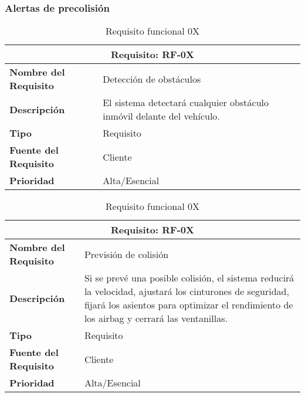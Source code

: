 \documentclass[10pt,a4paper,oldfontcommands]{dpds}
\begin{document}
\subsubsection{Alertas de precolisión}

\begin{table}[H]
\begin{center}
\begin{tabular}{p{} p{7cm}}
\multicolumn{2}{c}{\textbf{Requisito: RF-0X} } \\
\hline \hline
\textbf{Nombre del Requisito} & Detección de obstáculos\\
\textbf{Descripción} &  El sistema detectará cualquier obstáculo inmóvil delante del vehículo.\\
\textbf{Tipo} & Requisito  \\
\textbf{Fuente del Requisito} & Cliente  \\
\textbf{Prioridad} & Alta/Esencial \\ \hline
\end{tabular}
\caption{Requisito funcional 0X}
\label{tab:personal}
\end{center}
\end{table}

\begin{table}[H]
\begin{center}
\begin{tabular}{p{} p{7cm}}
\multicolumn{2}{c}{\textbf{Requisito: RF-0X} } \\
\hline \hline
\textbf{Nombre del Requisito} & Previsión de colisión\\
\textbf{Descripción} &  Si se prevé una posible colisión, el sistema reducirá la velocidad, ajustará los cinturones de seguridad, fijará los asientos para optimizar el rendimiento de los airbag y cerrará las ventanillas.\\
\textbf{Tipo} & Requisito  \\
\textbf{Fuente del Requisito} & Cliente  \\
\textbf{Prioridad} & Alta/Esencial \\ \hline
\end{tabular}
\caption{Requisito funcional 0X}
\label{tab:personal}
\end{center}
\end{table}
\end{document}
